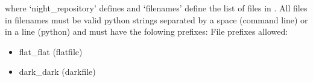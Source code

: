 \noindent where `night\_repository' defines \argnightname and `filenames' define the list of files in \argfilenames. All files in filenames must be valid python strings separated by a space (command line) or in a line (python) and must have the folowing prefixes:
\noindent File prefixes allowed:
\begin{itemize}
	\item flat\_flat (flatfile)
	\item dark\_dark (darkfile)
\end{itemize}








	
